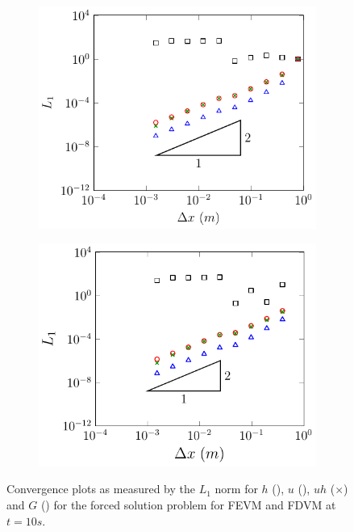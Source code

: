 \begin{figure}
	\centering
	\begin{subfigure}{0.5\textwidth}
		\includegraphics[width=\textwidth]{./chp5/figures/Forced/Dry/P2P/FEVML1.pdf}
		\vspace{0.5cm}
	\end{subfigure}%
	\begin{subfigure}{0.5\textwidth}
		\includegraphics[width=\textwidth]{./chp5/figures/Forced/Dry/P2P/FDVML1.pdf}
		\vspace{0.5cm}
	\end{subfigure}
	\caption{Convergence plots as measured by the $L_1$ norm for $h$ (), $u$ (),  $uh$ ({\color{green!60!black}$\times$})  and $G$ () for the forced solution problem for FEVM and FDVM at $t=10s$.}
	\label{fig:ForcedSolDryL1}
\end{figure}

